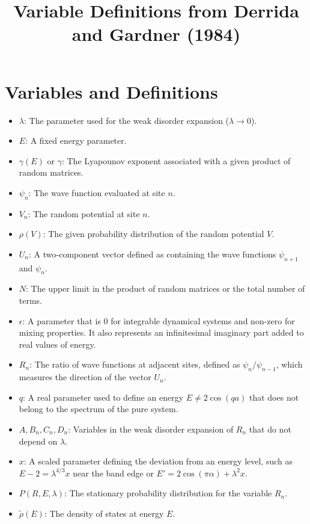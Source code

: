 \documentclass[11pt]{article}
\title{Variable Definitions from Derrida and Gardner (1984)}
\date{}
\begin{document}
\maketitle

\section*{Variables and Definitions}

\begin{itemize}
    \item $\lambda$: The parameter used for the weak disorder expansion ($\lambda \rightarrow 0$).
    \item $E$: A fixed energy parameter.
    \item $\gamma(E)$ or $\gamma$: The Lyapounov exponent associated with a given product of random matrices.
    \item $\psi_n$: The wave function evaluated at site $n$.
    \item $V_n$: The random potential at site $n$.
    \item $\rho(V)$: The given probability distribution of the random potential $V$.
    \item $U_n$: A two-component vector defined as containing the wave functions $\psi_{n+1}$ and $\psi_n$.
    \item $N$: The upper limit in the product of random matrices or the total number of terms.
    \item $\epsilon$: A parameter that is $0$ for integrable dynamical systems and non-zero for mixing properties. It also represents an infinitesimal imaginary part added to real values of energy.
    \item $R_n$: The ratio of wave functions at adjacent sites, defined as $\psi_n / \psi_{n-1}$, which measures the direction of the vector $U_n$.
    \item $q$: A real parameter used to define an energy $E \neq 2 \cos(qa)$ that does not belong to the spectrum of the pure system.
    \item $A, B_n, C_n, D_n$: Variables in the weak disorder expansion of $R_n$ that do not depend on $\lambda$.
    \item $x$: A scaled parameter defining the deviation from an energy level, such as $E-2 = \lambda^{4/3}x$ near the band edge or $E' = 2 \cos(\pi\alpha) + \lambda^2 x$.
    \item $P(R, E, \lambda)$: The stationary probability distribution for the variable $R_n$.
    \item $\tilde{\rho}(E)$: The density of states at energy $E$.

\end{itemize}
\end{document}
